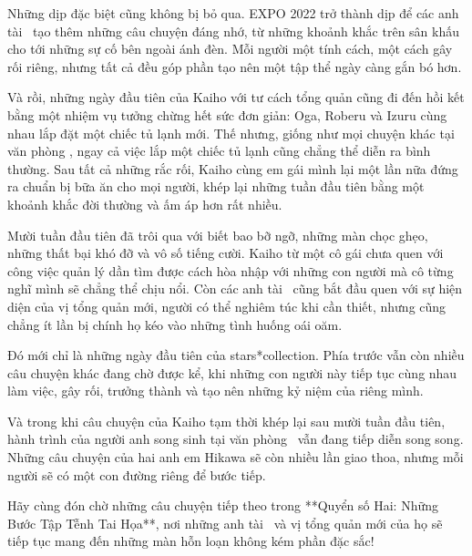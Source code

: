 \documentclass[main.tex]{subfiles}
\begin{document}
Những dịp đặc biệt cũng không bị bỏ qua. EXPO 2022 trở thành dịp để các anh tài \hls\ tạo thêm những câu chuyện đáng nhớ, từ những khoảnh khắc trên sân khấu cho tới những sự cố bên ngoài ánh đèn. Mỗi người một tính cách, một cách gây rối riêng, nhưng tất cả đều góp phần tạo nên một tập thể ngày càng gắn bó hơn.

Và rồi, những ngày đầu tiên của Kaiho với tư cách tổng quản cũng đi đến hồi kết bằng một nhiệm vụ tưởng chừng hết sức đơn giản: Oga, Roberu và Izuru cùng nhau lắp đặt một chiếc tủ lạnh mới. Thế nhưng, giống như mọi chuyện khác tại văn phòng \hls, ngay cả việc lắp một chiếc tủ lạnh cũng chẳng thể diễn ra bình thường. Sau tất cả những rắc rối, Kaiho cùng em gái mình lại một lần nữa đứng ra chuẩn bị bữa ăn cho mọi người, khép lại những tuần đầu tiên bằng một khoảnh khắc đời thường và ấm áp hơn rất nhiều.

Mười tuần đầu tiên đã trôi qua với biết bao bỡ ngỡ, những màn chọc ghẹo, những thất bại khó đỡ và vô số tiếng cười. Kaiho từ một cô gái chưa quen với công việc quản lý dần tìm được cách hòa nhập với những con người mà cô từng nghĩ mình sẽ chẳng thể chịu nổi. Còn các anh tài \hls\ cũng bắt đầu quen với sự hiện diện của vị tổng quản mới, người có thể nghiêm túc khi cần thiết, nhưng cũng chẳng ít lần bị chính họ kéo vào những tình huống oái oăm.

Đó mới chỉ là những ngày đầu tiên của stars*collection. Phía trước vẫn còn nhiều câu chuyện khác đang chờ được kể, khi những con người này tiếp tục cùng nhau làm việc, gây rối, trưởng thành và tạo nên những kỷ niệm của riêng mình.

Và trong khi câu chuyện của Kaiho tạm thời khép lại sau mười tuần đầu tiên, hành trình của người anh song sinh tại văn phòng \hll\ vẫn đang tiếp diễn song song. Những câu chuyện của hai anh em Hikawa sẽ còn nhiều lần giao thoa, nhưng mỗi người sẽ có một con đường riêng để bước tiếp.

Hãy cùng đón chờ những câu chuyện tiếp theo trong **Quyển số Hai: Những Bước Tập Tễnh Tai Họa**, nơi những anh tài \hls\ và vị tổng quản mới của họ sẽ tiếp tục mang đến những màn hỗn loạn không kém phần đặc sắc!
\end{document}
